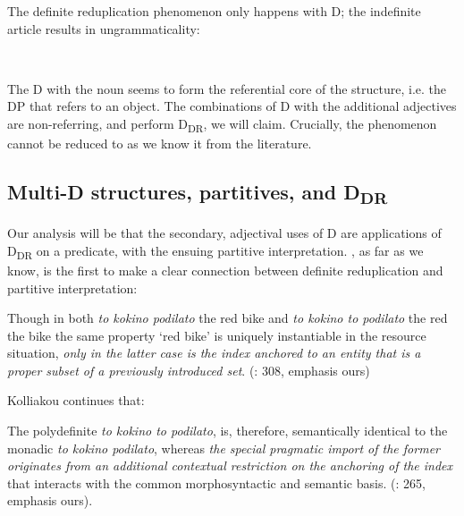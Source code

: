 \documentclass[output=paper,
modfonts
]{langscibook}
\begin{document}
The definite reduplication phenomenon only happens with D; the indefinite article results in ungrammaticality: \largerpage[3]

\ea\label{ex:etxeberria:44}  \\
\z
\z

The D with the noun seems to form the referential core of the structure, i.e.  the DP that refers to an object. The combinations of D with the additional adjectives are non-referring, and perform D\textsubscript{DR}, we will claim. Crucially, the phenomenon cannot be reduced to  as we know it from the literature.

\subsection{Multi-D structures, partitives, and D\textsubscript{DR}}

Our analysis will be that the secondary, adjectival uses of D are applications of D\textsubscript{DR} on a predicate, with the ensuing partitive interpretation. \citet{kolliakou2004}, as far as we know, is the first to make a clear connection between definite reduplication and partitive interpretation: 

\begin{displayquote}
Though in both \textit{to kokino podilato} {\ob}the red bike{\cb} and \textit{to kokino to podilato} {\ob}the red the bike{\cb} the same property `red bike' is uniquely instantiable {\ob}in the resource situation{\cb}, \textit{only in the latter case is the index anchored to an entity that is a proper subset of a previously introduced set}. (\citealt{kolliakou2004}: 308, emphasis ours)
\end{displayquote}

Kolliakou continues that: 

\begin{displayquote}
The polydefinite \textit{to kokino to podilato}, is, therefore, semantically identical to the monadic \textit{to kokino podilato}, whereas \textit{the special pragmatic import of the former originates from an additional contextual restriction on the anchoring of the index} that interacts with the common morphosyntactic and semantic basis. (\citealt{kolliakou2004}: 265, emphasis ours).
\end{displayquote}
\end{document}
